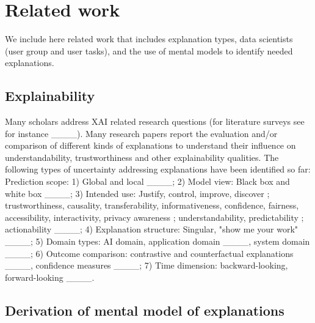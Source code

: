 \section{Related work}
\label{sec:RelatedWork}

We include here related work that includes explanation types, data scientists (user group and user tasks), and the use of mental models to identify needed explanations.


\subsection{Explainability}

Many scholars address XAI related research questions (for literature surveys see for instance ____). Many research papers report the evaluation and/or comparison of different kinds of explanations to understand their influence on understandability, trustworthiness and other explainability qualities. The following types of uncertainty addressing explanations have been identified so far: Prediction scope: 1) Global and local ____; 2) Model view: Black box and white box ____; 3) Intended use: Justify, control, improve, discover \cite[p. 52142--52143]{Adadi2018-article}; trustworthiness, causality, transferability, informativeness, confidence, fairness, accessibility, interactivity, privacy awareness \cite[p. 8--10]{Arrieta2020-article}; understandability, predictability \cite[p. 8]{Mohseni2021-article}; actionability ____; 4) Explanation structure: Singular, "show me your work" ____; 5) Domain types: AI domain, application domain ____, system domain ____; 6) Outcome comparison: contrastive and counterfactual explanations ____, confidence measures ____; 7) Time dimension: backward-looking, forward-looking ____.


\subsection{Derivation of mental model of explanations}


